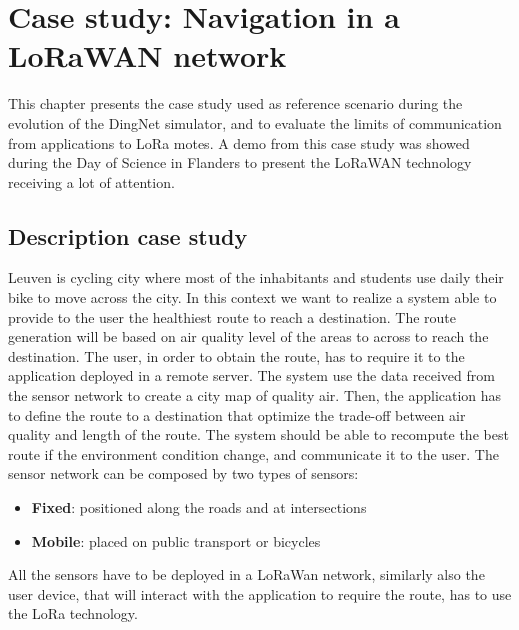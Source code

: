 \chapter{Case study: Navigation in a LoRaWAN network}
\label{chap:case-staudyLoRa}

This chapter presents the case study used as reference scenario during the evolution of the DingNet simulator, and to evaluate the limits of communication from applications to LoRa motes. 
A demo from this case study was showed during the Day of Science in Flanders to present the LoRaWAN technology receiving a lot of attention.

\section{Description case study}
Leuven is cycling city where most of the inhabitants and students use daily their bike to move across the city. 
In this context we want to realize a system able to provide to the user the healthiest route to reach a destination. 
The route generation will be based on air quality level of the areas to across to reach the destination. 
The user, in order to obtain the route, has to require it to the application deployed in a remote server.
The system use the data received from the sensor network to create a city map of quality air.
Then, the application has to define the route to a destination that optimize the trade-off between air quality and length of the route.
The system should be able to recompute the best route if the environment condition change, and communicate it to the user.
The sensor network can be composed by two types of sensors:
\begin{itemize}
    \item \textbf{Fixed}: positioned along the roads and at intersections
    \item \textbf{Mobile}: placed on public transport or bicycles
\end{itemize}
All the sensors have to be deployed in a LoRaWan network, similarly also the user device, that will interact with the application to require the route, has to use the LoRa technology.

